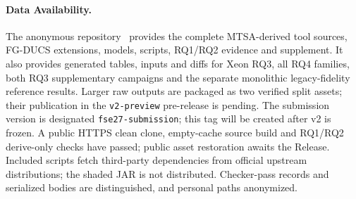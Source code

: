 \documentclass[acmsmall,screen,review,anonymous]{acmart}
\begin{document}
\clearpage
\paragraph{Data Availability.}
The anonymous repository~\cite{FGDUCSAnonymousArtifact} provides the complete MTSA-derived tool sources, FG-DUCS extensions, models, scripts, RQ1/RQ2 evidence and supplement. It also provides generated tables, inputs and diffs for Xeon RQ3, all RQ4 families, both RQ3 supplementary campaigns and the separate monolithic legacy-fidelity reference results. Larger raw outputs are packaged as two verified split assets; their publication in the \texttt{v2-preview} pre-release is pending. The submission version is designated \texttt{fse27-submission}; this tag will be created after v2 is frozen. A public HTTPS clean clone, empty-cache source build and RQ1/RQ2 derive-only checks have passed; public asset restoration awaits the Release. Included scripts fetch third-party dependencies from official upstream distributions; the shaded JAR is not distributed. Checker-pass records and serialized bodies are distinguished, and personal paths anonymized.



\end{document}
